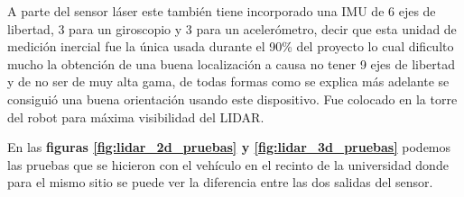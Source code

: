 A parte del sensor láser este también tiene incorporado una IMU de 6 ejes de libertad, 3 para un giroscopio y 3 para un acelerómetro, 
decir que esta unidad de medición inercial fue la única usada durante el 90\% del proyecto lo cual dificulto mucho la obtención de una 
buena localización a causa no tener 9 ejes de libertad y de no ser de muy alta gama, de todas formas como se explica más adelante se 
consiguió una buena orientación usando este dispositivo. Fue colocado en la torre del robot para máxima visibilidad del LIDAR.

En las \textbf{figuras \ref{fig:lidar_2d_pruebas} y \ref{fig:lidar_3d_pruebas}} podemos las pruebas que se hicieron con el vehículo en el recinto 
de la universidad donde para el mismo sitio se puede ver la diferencia entre las dos salidas del sensor.



